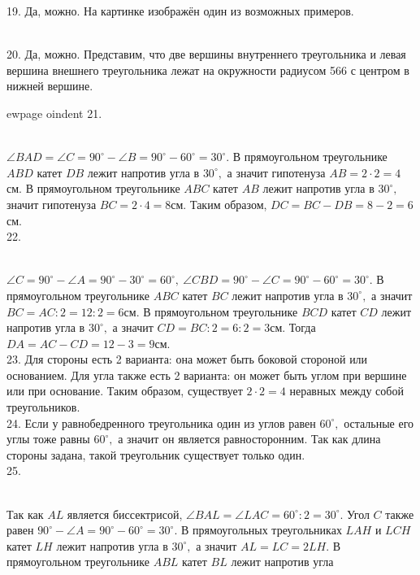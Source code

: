 19. Да, можно. На картинке изображён один из возможных примеров.
\begin{figure}[ht!]
\end{figure}\\
20. Да, можно. Представим, что две вершины внутреннего треугольника и левая вершина внешнего треугольника лежат на окружности радиусом 566 с центром в нижней вершине.
\begin{figure}[ht!]
\end{figure}
ewpage
oindent
21. \begin{figure}[ht!]
\end{figure}\\
$\angle BAD=\angle C=90^\circ-\angle B=90^\circ-60^\circ=30^\circ.$ В прямоугольном треугольнике $ABD$ катет $DB$ лежит напротив угла в $30^\circ,$ а значит гипотенуза $AB=2\cdot2=4$см. В прямоугольном треугольнике $ABC$ катет $AB$ лежит напротив угла в $30^\circ,$ значит гипотенуза $BC=2\cdot4=8$см. Таким образом, $DC=BC-DB=8-2=6$см.\\
22. \begin{figure}[ht!]
\end{figure}\\
$\angle C=90^\circ-\angle A=90^\circ-30^\circ=60^\circ,\ \angle CBD=90^\circ-\angle C=90^\circ-60^\circ=30^\circ.$ В прямоугольном треугольнике $ABC$ катет $BC$ лежит напротив угла в $30^\circ,$ а значит $BC=AC:2=12:2=6$см. В прямоугольном треугольнике $BCD$ катет $CD$ лежит напротив угла в $30^\circ,$ а значит $CD=BC:2=6:2=3$см. Тогда $DA=AC-CD=12-3=9$см.\\
23. Для стороны есть 2 варианта: она может быть боковой стороной или основанием. Для угла также есть 2 варианта: он может быть углом при вершине или при основание. Таким образом, существует $2\cdot2=4$ неравных между собой треугольников.\\
24. Если у равнобедренного треугольника один из углов равен $60^\circ,$ остальные его углы тоже равны $60^\circ,$ а значит он является равносторонним. Так как длина стороны задана, такой треугольник существует только один.\\
25. \begin{figure}[ht!]
\end{figure}\\
Так как $AL$ является биссектрисой, $\angle BAL=\angle LAC=60^\circ:2=30^\circ.$ Угол $C$ также равен $90^\circ-\angle A=90^\circ-60^\circ=30^\circ.$ В прямоугольных треугольниках $LAH$ и $LCH$ катет $LH$ лежит напротив угла в $30^\circ,$ а значит $AL=LC=2LH.$ В прямоугольном треугольнике $ABL$ катет $BL$ лежит напротив угла
